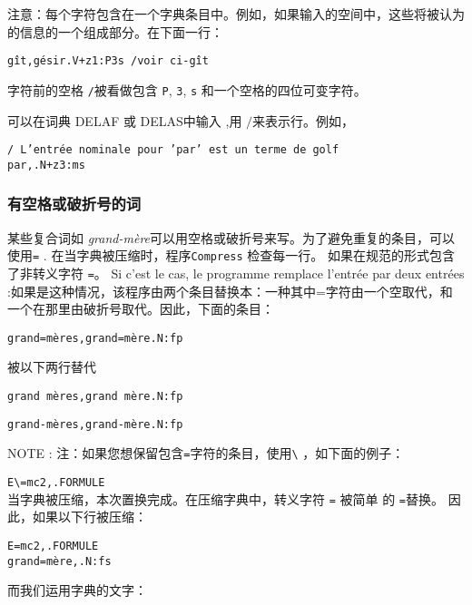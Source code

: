 \bigskip
\noindent 注意：每个字符包含在一个字典条目中。例如，如果输入的空间中，这些将被认为的信息的一个组成部分。在下面一行：


\begin{verbatim}
gît,gésir.V+z1:P3s /voir ci-gît
\end{verbatim}

\bigskip \noindent 字符前的空格 \verb+/+被看做包含 \verb+P+, \verb+3+, \verb+s+ 和一个空格的四位可变字符。


\bigskip \noindent 可以在词典 DELAF 或 DELAS中输入
,用 $/$来表示行。例如，

\bigskip
\begin{verbatim}
/ L’entrée nominale pour ’par’ est un terme de golf
par,.N+z3:ms
\end{verbatim}


\subsubsection{有空格或破折号的词}

\index{\verb+=+}\index{\verb+\=+}

某些复合词如 \textit{grand-mère}可以用空格或破折号来写。为了避免重复的条目，可以使用\verb+=+ . 在当字典被压缩时，程序\verb+Compress+
 检查每一行。
如果在规范的形式包含了非转义字符 \verb+=+。 Si c’est le cas, le
programme remplace l’entrée par deux entrées :如果是这种情况，该程序由两个条目替换本：一种其中=字符由一个空取代，和一个在那里由破折号取代。因此，下面的条目：


\bigskip \verb$grand=mères,grand=mère.N:fp$

\bigskip
\noindent 被以下两行替代

\bigskip
\verb$grand mères,grand mère.N:fp$

\verb$grand-mères,grand-mère.N:fp$


\bigskip
\noindent NOTE : 注：如果您想保留包含\verb+=+字符的条目，使用\verb+\+ ，如下面的例子：


\bigskip
\verb$E\=mc2,.FORMULE$\\

当字典被压缩，本次置换完成。在压缩字典中，转义字符 \verb+=+ 被简单 的 \verb+=+替换。
因此，如果以下行被压缩： 

\begin{verbatim}
E=mc2,.FORMULE
grand=mère,.N:fs
\end{verbatim}

\noindent 而我们运用字典的文字：

